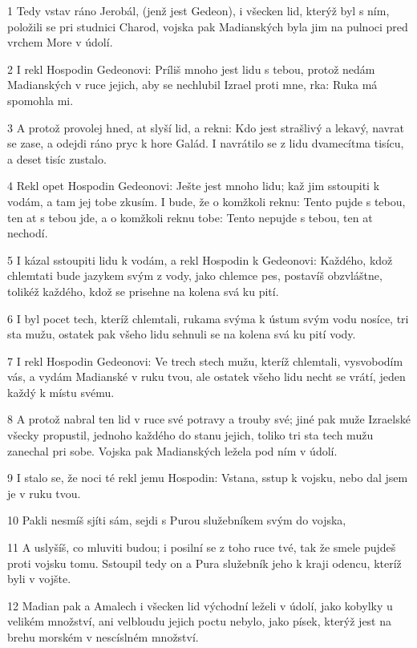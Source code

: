 \par 1 Tedy vstav ráno Jerobál, (jenž jest Gedeon), i všecken lid, kterýž byl s ním, položili se pri studnici Charod, vojska pak Madianských byla jim na pulnoci pred vrchem More v údolí.
\par 2 I rekl Hospodin Gedeonovi: Príliš mnoho jest lidu s tebou, protož nedám Madianských v ruce jejich, aby se nechlubil Izrael proti mne, rka: Ruka má spomohla mi.
\par 3 A protož provolej hned, at slyší lid, a rekni: Kdo jest strašlivý a lekavý, navrat se zase, a odejdi ráno pryc k hore Galád. I navrátilo se z lidu dvamecítma tisícu, a deset tisíc zustalo.
\par 4 Rekl opet Hospodin Gedeonovi: Ješte jest mnoho lidu; kaž jim sstoupiti k vodám, a tam jej tobe zkusím. I bude, že o komžkoli reknu: Tento pujde s tebou, ten at s tebou jde, a o komžkoli reknu tobe: Tento nepujde s tebou, ten at nechodí.
\par 5 I kázal sstoupiti lidu k vodám, a rekl Hospodin k Gedeonovi: Každého, kdož chlemtati bude jazykem svým z vody, jako chlemce pes, postavíš obzvláštne, tolikéž každého, kdož se prisehne na kolena svá ku pití.
\par 6 I byl pocet tech, kteríž chlemtali, rukama svýma k ústum svým vodu nosíce, tri sta mužu, ostatek pak všeho lidu sehnuli se na kolena svá ku pití vody.
\par 7 I rekl Hospodin Gedeonovi: Ve trech stech mužu, kteríž chlemtali, vysvobodím vás, a vydám Madianské v ruku tvou, ale ostatek všeho lidu necht se vrátí, jeden každý k místu svému.
\par 8 A protož nabral ten lid v ruce své potravy a trouby své; jiné pak muže Izraelské všecky propustil, jednoho každého do stanu jejich, toliko tri sta tech mužu zanechal pri sobe. Vojska pak Madianských ležela pod ním v údolí.
\par 9 I stalo se, že noci té rekl jemu Hospodin: Vstana, sstup k vojsku, nebo dal jsem je v ruku tvou.
\par 10 Pakli nesmíš sjíti sám, sejdi s Purou služebníkem svým do vojska,
\par 11 A uslyšíš, co mluviti budou; i posilní se z toho ruce tvé, tak že smele pujdeš proti vojsku tomu. Sstoupil tedy on a Pura služebník jeho k kraji odencu, kteríž byli v vojšte.
\par 12 Madian pak a Amalech i všecken lid východní leželi v údolí, jako kobylky u velikém množství, ani velbloudu jejich poctu nebylo, jako písek, kterýž jest na brehu morském v nescíslném množství.
